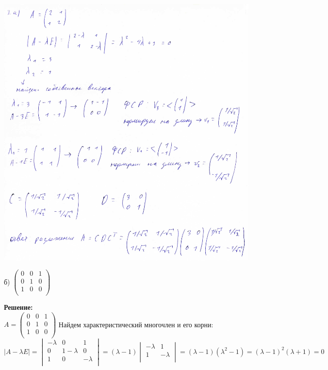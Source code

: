 \documentclass[a4paper,12pt]{article}
\begin{document}
\begin{enumerate}
\includegraphics[width=\textwidth]{img/img200.pdf}


б) 
$
\begin{pmatrix}
{0}&{0}&{1}\\
{0}&{1}&{0}\\
{1}&{0}&{0}\\
\end{pmatrix}
$


\vspace{5pt}
\textbf{Решение:}\\
$A =\begin{pmatrix}
{0}&{0}&{1}\\
{0}&{1}&{0}\\
{1}&{0}&{0}\\
\end{pmatrix}$
Найдем характеристический многочлен и его корни:\\
$|A-\lambda E|= \begin{vmatrix}
{-\lambda}&{0}&{1}\\
{0}&{1-\lambda}&{0}\\
{1}&{0}&{-\lambda}\\
\end{vmatrix}=(\lambda-1)\begin{vmatrix}
{-\lambda}&{1}\\
{1}&{-\lambda}\\
\end{vmatrix}=(\lambda-1)(\lambda^2-1)=(\lambda-1)^2(\lambda+1)=0$


\end{enumerate}
\end{document}
